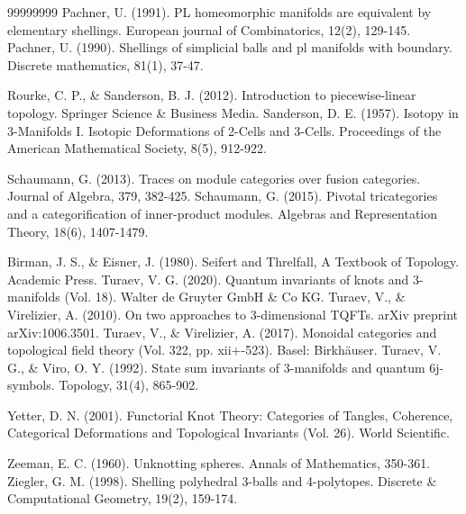 \documentclass[1.5pt, a4paper]{article}
\begin{document}
\begin{thebibliography}{99999999}
 Pachner, U. (1991). PL homeomorphic manifolds are equivalent by elementary shellings. European journal of Combinatorics, 12(2), 129-145.
 Pachner, U. (1990). Shellings of simplicial balls and pl manifolds with boundary. Discrete mathematics, 81(1), 37-47.

 Rourke, C. P., \& Sanderson, B. J. (2012). Introduction to piecewise-linear topology. Springer Science \& Business Media.
 Sanderson, D. E. (1957). Isotopy in 3-Manifolds I. Isotopic Deformations of 2-Cells and 3-Cells. Proceedings of the American Mathematical Society, 8(5), 912-922.

 Schaumann, G. (2013). Traces on module categories over fusion categories. Journal of Algebra, 379, 382-425.
 Schaumann, G. (2015). Pivotal tricategories and a categorification of inner-product modules. Algebras and Representation Theory, 18(6), 1407-1479.


 Birman, J. S., \& Eisner, J. (1980). Seifert and Threlfall, A Textbook of Topology. Academic Press.
 Turaev, V. G. (2020). Quantum invariants of knots and 3-manifolds (Vol. 18). Walter de Gruyter GmbH \& Co KG.
 Turaev, V., \& Virelizier, A. (2010). On two approaches to 3-dimensional TQFTs. arXiv preprint arXiv:1006.3501.
 Turaev, V., \& Virelizier, A. (2017). Monoidal categories and topological field theory (Vol. 322, pp. xii+-523). Basel: Birkh\"auser.
 Turaev, V. G., \& Viro, O. Y. (1992). State sum invariants of 3-manifolds and quantum 6j-symbols. Topology, 31(4), 865-902.

 Yetter, D. N. (2001). Functorial Knot Theory: Categories of Tangles, Coherence, Categorical Deformations and Topological Invariants (Vol. 26). World Scientific.

 Zeeman, E. C. (1960). Unknotting spheres. Annals of Mathematics, 350-361.
 Ziegler, G. M. (1998). Shelling polyhedral 3-balls and 4-polytopes. Discrete \& Computational Geometry, 19(2), 159-174.
\end{thebibliography}
\end{document}
